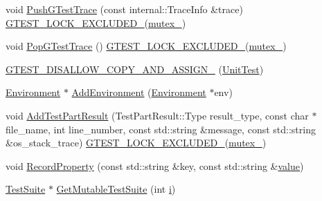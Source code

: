 \begin{DoxyCompactItemize}
void \mbox{\hyperlink{classtesting_1_1_unit_test_af455b953108ff09b3b6e41011653e78a}{Push\+G\+Test\+Trace}} (const internal\+::\+Trace\+Info \&trace) \mbox{\hyperlink{_obj__test_2lib_2googletest-release-1_88_81_2googletest_2include_2gtest_2internal_2gtest-port_8h_a69abff5a4efdd07bd5faebe3dd318d06}{G\+T\+E\+S\+T\+\_\+\+L\+O\+C\+K\+\_\+\+E\+X\+C\+L\+U\+D\+E\+D\+\_\+}}(\mbox{\hyperlink{classtesting_1_1_unit_test_abb94ef45cf0ab43be81ac6d5b1364132}{mutex\+\_\+}})
\item 
void \mbox{\hyperlink{classtesting_1_1_unit_test_a70b3e3282778bc9a36520fe0a8be3c57}{Pop\+G\+Test\+Trace}} () \mbox{\hyperlink{_obj__test_2lib_2googletest-release-1_88_81_2googletest_2include_2gtest_2internal_2gtest-port_8h_a69abff5a4efdd07bd5faebe3dd318d06}{G\+T\+E\+S\+T\+\_\+\+L\+O\+C\+K\+\_\+\+E\+X\+C\+L\+U\+D\+E\+D\+\_\+}}(\mbox{\hyperlink{classtesting_1_1_unit_test_abb94ef45cf0ab43be81ac6d5b1364132}{mutex\+\_\+}})
\item 
\mbox{\hyperlink{classtesting_1_1_unit_test_a1e04cfb4f837cea288a98f2a64c43bba}{G\+T\+E\+S\+T\+\_\+\+D\+I\+S\+A\+L\+L\+O\+W\+\_\+\+C\+O\+P\+Y\+\_\+\+A\+N\+D\+\_\+\+A\+S\+S\+I\+G\+N\+\_\+}} (\mbox{\hyperlink{classtesting_1_1_unit_test}{Unit\+Test}})
\item 
\mbox{\hyperlink{classtesting_1_1_environment}{Environment}} $\ast$ \mbox{\hyperlink{classtesting_1_1_unit_test_a3b64e1255cbd346e0ce40cd3e7a514f7}{Add\+Environment}} (\mbox{\hyperlink{classtesting_1_1_environment}{Environment}} $\ast$env)
\item 
void \mbox{\hyperlink{classtesting_1_1_unit_test_a1d157d2e9a5c1d3405333410c6b13932}{Add\+Test\+Part\+Result}} (Test\+Part\+Result\+::\+Type result\+\_\+type, const char $\ast$file\+\_\+name, int line\+\_\+number, const std\+::string \&message, const std\+::string \&os\+\_\+stack\+\_\+trace) \mbox{\hyperlink{_obj__test_2lib_2googletest-release-1_88_81_2googletest_2include_2gtest_2internal_2gtest-port_8h_a69abff5a4efdd07bd5faebe3dd318d06}{G\+T\+E\+S\+T\+\_\+\+L\+O\+C\+K\+\_\+\+E\+X\+C\+L\+U\+D\+E\+D\+\_\+}}(\mbox{\hyperlink{classtesting_1_1_unit_test_abb94ef45cf0ab43be81ac6d5b1364132}{mutex\+\_\+}})
\item 
void \mbox{\hyperlink{classtesting_1_1_unit_test_a2c96a4a02c34095e07c6999e7686367f}{Record\+Property}} (const std\+::string \&key, const std\+::string \&\mbox{\hyperlink{_obj__test_2lib_2googletest-master_2googlemock_2test_2gmock-matchers__test_8cc_a337b8a670efc0b086ad3af163f3121b6}{value}})
\item 
\mbox{\hyperlink{classtesting_1_1_test_suite}{Test\+Suite}} $\ast$ \mbox{\hyperlink{classtesting_1_1_unit_test_a3031406e588a7ac018b106dd995fdf91}{Get\+Mutable\+Test\+Suite}} (int \mbox{\hyperlink{_obj__test_2lib_2googletest-master_2googlemock_2test_2gmock-matchers__test_8cc_acb559820d9ca11295b4500f179ef6392}{i}})

\end{DoxyCompactItemize}
